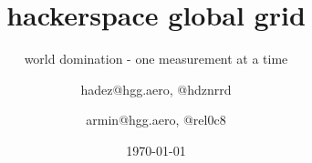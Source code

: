 




\usepackage{url}
%

\usepackage{listings}
  
\usepackage[utf8]{inputenc}
\usepackage[T1]{fontenc}
\usepackage{lmodern}
\usepackage[ngerman]{babel}

\usepackage{amsmath}

\usepackage{array}
\usepackage{longtable}
\usepackage{graphicx}
\graphicspath{{./pic/}}

\newcommand{\shack}{\includegraphics<.->[height=1em]{shack_brightbg}}
\newcommand{\hgg}{\includegraphics<.->[height=1em]{hgg_logo_rgb_pos}}


\date{\today}

 
\title{hackerspace global grid} 
\subtitle{world domination - one measurement at a time}
\author[hdz, reloc0]{hadez@hgg.aero, @hdznrrd \and armin@hgg.aero, @rel0c8}

\subject{Vortragsreihe des CCCS}

\titlegraphic{}


\AtBeginSection
{
  \begin{frame}
  \end{frame}
}

\AtBeginSubsection
{
  \begin{frame}
  \end{frame}
}






